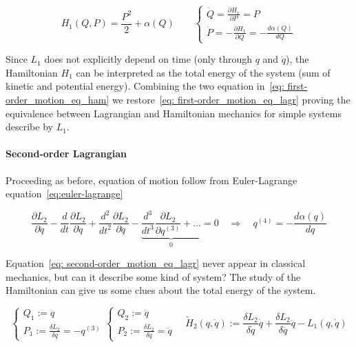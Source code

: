 \begin{equation} \label{eq: first-order_motion_eq_ham}
  H_1(Q, P) = \frac{P^2}{2} + \alpha(Q) \qquad
  \begin{cases}
    \dot{Q} =   \frac{\partial H_1}{\partial P} = P \\
    \dot{P} = - \frac{\partial H_1}{\partial Q} = - \frac{d\alpha(Q)}{dQ}
  \end{cases}
\end{equation}

Since $L_1$ does not explicitly depend on time (only through $q$ and $\dot{q}$),
the Hamiltonian $H_1$ can be interpreted as the total energy of the system (sum
of kinetic and potential energy). Combining the two equation in~\eqref{eq:
first-order_motion_eq_ham} we restore~\eqref{eq: first-order_motion_eq_lagr}
proving the equivalence between Lagrangian and Hamiltonian mechanics for simple
systems describe by $L_1$.


\paragraph{Second-order Lagrangian} Proceeding as before, equation of motion
follow from Euler-Lagrange equation~\eqref{eq:euler-lagrange}

\begin{equation} \label{eq: second-order_motion_eq_lagr}
  \frac{\partial L_2}{\partial q} -
  \frac{d}{dt}\frac{\partial L_2}{\partial \dot{q}} +
  \frac{d^2}{dt^2}\frac{\partial L_2}{\partial \ddot{q}} -
  \underbrace{
    \frac{d^3}{dt^3}\frac{\partial L_2}{\partial q^{(3)}} + \ldots
  }_0 = 0
  \quad \Rightarrow \quad
  q^{(4)} = - \frac{d\alpha(q)}{dq}
\end{equation}

Equation~\eqref{eq: second-order_motion_eq_lagr} never appear in classical
mechanics, but can it describe some kind of system? The study of the Hamiltonian
can give us some clues about the total energy of the system.

\begin{equation*}
  \begin{cases}
    Q_1 := q \\
    P_1 := \frac{\delta L_2}{\delta \dot{q}} = -q^{(3)}
  \end{cases}
  \begin{cases}
    Q_2 := \dot{q} \\
    P_2 := \frac{\delta L_2}{\delta \ddot{q}} = \ddot{q}
  \end{cases}
  \quad
  \tilde{H}_2(q, \dot{q}) :=
    \frac{\delta L_2}{\delta \dot{q}} \dot{q} +
    \frac{\delta L_2}{\delta \ddot{q}} \ddot{q} -
    L_1(q, \dot{q})
\end{equation*}

